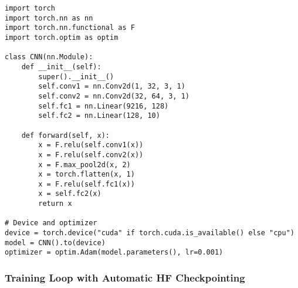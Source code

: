 \begin{tcolorbox}[colback=green!5!white, colframe=green!75!black, title=Example CNN Model]
\begin{verbatim}
import torch
import torch.nn as nn
import torch.nn.functional as F
import torch.optim as optim

class CNN(nn.Module):
    def __init__(self):
        super().__init__()
        self.conv1 = nn.Conv2d(1, 32, 3, 1)
        self.conv2 = nn.Conv2d(32, 64, 3, 1)
        self.fc1 = nn.Linear(9216, 128)
        self.fc2 = nn.Linear(128, 10)

    def forward(self, x):
        x = F.relu(self.conv1(x))
        x = F.relu(self.conv2(x))
        x = F.max_pool2d(x, 2)
        x = torch.flatten(x, 1)
        x = F.relu(self.fc1(x))
        x = self.fc2(x)
        return x

# Device and optimizer
device = torch.device("cuda" if torch.cuda.is_available() else "cpu")
model = CNN().to(device)
optimizer = optim.Adam(model.parameters(), lr=0.001)
\end{verbatim}
\end{tcolorbox}

\subsubsection{Training Loop with Automatic HF Checkpointing}

